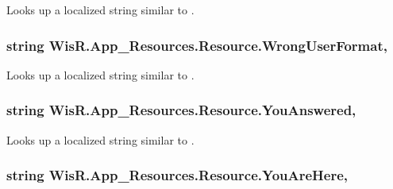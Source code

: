 Looks up a localized string similar to . 

\hypertarget{class_wis_r_1_1_app___resources_1_1_resource_aa72f48580bba002395cf368c80207724}{}
\subsubsection[{Wrong\+User\+Format}]{\setlength{\rightskip}{0pt plus 5cm}string Wis\+R.\+App\+\_\+\+Resources.\+Resource.\+Wrong\+User\+Format\hspace{0.3cm}{\ttfamily [static]}, {\ttfamily [get]}}\label{class_wis_r_1_1_app___resources_1_1_resource_aa72f48580bba002395cf368c80207724}


Looks up a localized string similar to . 

\hypertarget{class_wis_r_1_1_app___resources_1_1_resource_abf024f56cae4f6745c169c03db91d899}{}
\subsubsection[{You\+Answered}]{\setlength{\rightskip}{0pt plus 5cm}string Wis\+R.\+App\+\_\+\+Resources.\+Resource.\+You\+Answered\hspace{0.3cm}{\ttfamily [static]}, {\ttfamily [get]}}\label{class_wis_r_1_1_app___resources_1_1_resource_abf024f56cae4f6745c169c03db91d899}


Looks up a localized string similar to . 

\hypertarget{class_wis_r_1_1_app___resources_1_1_resource_ab86752c6994c2051e6bb075b5b39c6d3}{}
\subsubsection[{You\+Are\+Here}]{\setlength{\rightskip}{0pt plus 5cm}string Wis\+R.\+App\+\_\+\+Resources.\+Resource.\+You\+Are\+Here\hspace{0.3cm}{\ttfamily [static]}, {\ttfamily [get]}}\label{class_wis_r_1_1_app___resources_1_1_resource_ab86752c6994c2051e6bb075b5b39c6d3}


